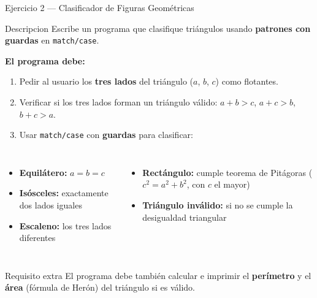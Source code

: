 \documentclass[aspectratio=169,xcolor=dvipsnames]{beamer}
\begin{document}
\begin{frame}{Ejercicio 2 — Clasificador de Figuras Geométricas}
    \begin{block}{Descripcion}
        Escribe un programa que clasifique triángulos usando \textbf{patrones con guardas} en \texttt{match/case}.
    \end{block}

    \vspace{0.2cm}
    \textbf{El programa debe:}
    \begin{enumerate}
        \item Pedir al usuario los \textbf{tres lados} del triángulo ($a$, $b$, $c$) como flotantes.
        \item Verificar si los tres lados forman un triángulo válido: $a + b > c$, $a + c > b$, $b + c > a$.
        \item Usar \texttt{match/case} con \textbf{guardas} para clasificar:
    \end{enumerate}

    \vspace{0.2cm}
    \begin{columns}
        \begin{itemize}
            \item \textbf{Equilátero:} $a = b = c$
            \item \textbf{Isósceles:} exactamente dos lados iguales
            \item \textbf{Escaleno:} los tres lados diferentes
        \end{itemize}
        \begin{itemize}
            \item \textbf{Rectángulo:} cumple teorema de Pitágoras ($c^2 = a^2 + b^2$, con $c$ el mayor)
            \item \textbf{Triángulo inválido:} si no se cumple la desigualdad triangular
        \end{itemize}
    \end{columns}

    \vspace{0.2cm}
    \begin{alertblock}{Requisito extra}
        El programa debe también calcular e imprimir el \textbf{perímetro} y el \textbf{área} (fórmula de Herón) del triángulo si es válido.
    \end{alertblock}
\end{frame}
\end{document}
